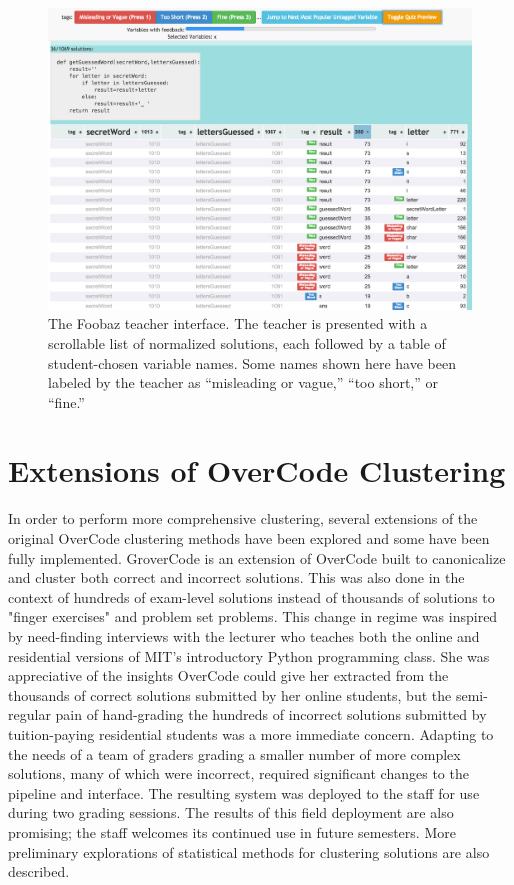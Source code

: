 \begin{figure}
	\centering
	\includegraphics[width=1.0\linewidth]{Body/figures/FoobazInitialFat.png}
	\caption{The Foobaz teacher interface. The teacher is presented with a scrollable list of normalized solutions, each followed by a table of student-chosen variable names. Some names shown here have been labeled by the teacher as ``misleading or vague,'' ``too short,'' or ``fine.''}
	\label{fig:figure2}
\end{figure}


\section{Extensions of OverCode Clustering}

In order to perform more comprehensive clustering, several extensions of the original OverCode clustering methods have been explored and some have been fully implemented.
GroverCode is an extension of OverCode built to canonicalize and cluster both correct and incorrect solutions. This was also done in the context of hundreds of exam-level solutions instead of thousands of solutions to "finger exercises" and problem set problems. This change in regime was inspired by need-finding interviews with the lecturer who teaches both the online and residential versions of MIT's introductory Python programming class. She was appreciative of the insights OverCode could give her extracted from the thousands of correct solutions submitted by her online students, but the semi-regular pain of hand-grading the hundreds of incorrect solutions submitted by tuition-paying residential students was a more immediate concern. Adapting to the needs of a team of graders grading a smaller number of more complex solutions, many of which were incorrect, required significant changes to the pipeline and interface. The resulting system was deployed to the staff for use during two grading sessions. The results of this field deployment are also promising; the staff welcomes its continued use in future semesters. More preliminary explorations of statistical methods for clustering solutions are also described.


